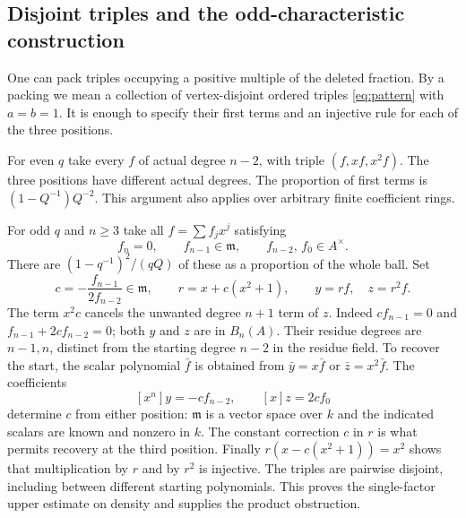 \subsection{Disjoint triples and the odd-characteristic construction}
One can pack triples occupying a positive multiple of the deleted fraction. By a packing we mean a collection of vertex-disjoint ordered triples \eqref{eq:pattern} with $a=b=1$. It is enough to specify their first terms and an injective rule for each of the three positions.

For even $q$ take every $f$ of actual degree $n-2$, with triple $(f,xf,x^2f)$. The three positions have different actual degrees. The proportion of first terms is $(1-Q^{-1})Q^{-2}$. This argument also applies over arbitrary finite coefficient rings.

For odd $q$ and $n\ge3$ take all $f=\sum f_jx^j$ satisfying
\[
   f_n=0,\qquad f_{n-1}\in\mathfrak m,\qquad
   f_{n-2},\,f_0\in A^\times .
\]
There are $(1-q^{-1})^2/(qQ)$ of these as a proportion of the whole ball. Set
\[
       c=-\frac{f_{n-1}}{2 f_{n-2}}\in\mathfrak m,\qquad
       r=x+c(x^2+1),\qquad y=rf,\quad z=r^2f .
\]
The term $x^2c$ cancels the unwanted degree $n+1$ term of $z$. Indeed $c f_{n-1}=0$ and $f_{n-1}+2c f_{n-2}=0$; both $y$ and $z$ are in $B_n(A)$. Their residue degrees are $n-1,n$, distinct from the starting degree $n-2$ in the residue field. To recover the start, the scalar polynomial $\bar f$ is obtained from $\bar y=x\bar f$ or $\bar z=x^2\bar f$. The coefficients
\[
       [x^n]y=-c f_{n-2},\qquad [x]z=2c f_0
\]
determine $c$ from either position: $\mathfrak m$ is a vector space over $k$ and the indicated scalars are known and nonzero in $k$. The constant correction $c$ in $r$ is what permits recovery at the third position. Finally $r(x-c(x^2+1))=x^2$ shows that multiplication by $r$ and by $r^2$ is injective. The triples are pairwise disjoint, including between different starting polynomials. This proves the single-factor upper estimate on density and supplies the product obstruction.

